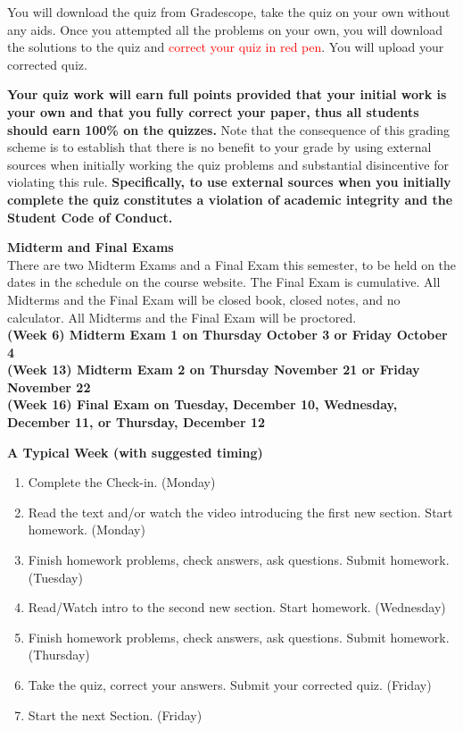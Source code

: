 \documentclass[12pt]{article}
\renewcommand{\emph}[1]{\textsf{\textbf{#1}}}
\newcommand{\localhead}[1]{\par\smallskip\textbf{#1} \smallskip\nobreak\\}%
\def\heading#1{\localhead{\large\emph{#1}}}
\begin{document}
You will download the quiz from Gradescope, take the quiz on your own without any aids. Once you attempted all the problems on your own, you will download the solutions to the quiz and \textcolor{red}{correct your quiz in red pen}. You will upload your corrected quiz. 

\textbf{Your quiz work will earn full points provided that your initial work is your own and that you fully correct your paper, thus all students should earn 100\% on the quizzes.} Note that the consequence of this grading scheme is to establish that there is no benefit to your grade by using external sources when initially working the quiz problems and substantial disincentive for violating this rule. \textbf{Specifically, to use external sources when you initially complete the quiz constitutes a violation of academic integrity and the Student Code of Conduct. }

\pagebreak

\heading{Midterm and Final Exams}
There are two Midterm Exams and a Final Exam this semester, to be held on the dates in the schedule on the course website. The Final Exam is cumulative. All Midterms and the Final Exam will be closed book, closed notes, and no calculator. All Midterms and the Final Exam will be proctored.\\

\emph{(Week 6) Midterm Exam 1 on Thursday October 3 or Friday October 4} \\
\emph{(Week 13) Midterm Exam 2 on Thursday November 21 or Friday November 22}  \\
\emph{(Week 16) Final Exam on Tuesday, December 10, Wednesday, December 11, or Thursday, December 12}\\ 

\heading{A Typical Week (with suggested timing)}
\vspace*{-.2in}
\begin{enumerate}
\item Complete the Check-in. (Monday) 
\item Read the text and/or watch the video introducing the first new section. Start homework.  (Monday)
\item Finish homework problems, check answers, ask questions. Submit homework.  (Tuesday)
\item Read/Watch intro to the second new section. Start homework.  (Wednesday)
\item Finish homework problems, check answers, ask questions. Submit homework. (Thursday)
\item Take the quiz, correct your answers. Submit your corrected quiz.  (Friday)
\item Start the next Section. (Friday)
\end{enumerate}
\end{document}
